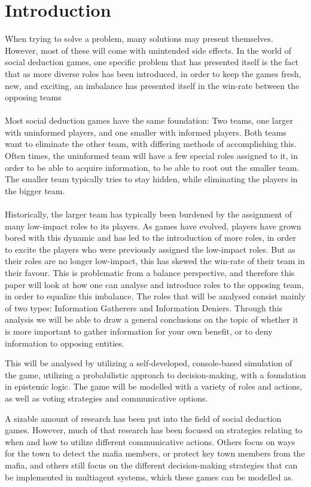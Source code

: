 \section{Introduction}
When trying to solve a problem, many solutions may present themselves. However,
most of these will come with unintended side effects. In the world of social
deduction games, one specific problem that has presented itself is the fact
that as more diverse roles has been introduced, in order to keep the games
fresh, new, and exciting, an imbalance has presented itself in the win-rate
between the opposing teams \\ \\ Most social deduction games have the same
foundation: Two teams, one larger with uninformed players, and one smaller with
informed players. Both teams want to eliminate the other team, with differing
methods of accomplishing this. Often times, the uninformed team will have a few
special roles assigned to it, in order to be able to acquire information, to be
able to root out the smaller team. The smaller team typically tries to stay
hidden, while eliminating the players in the bigger team.\\ \\ Historically,
the larger team has typically been burdened by the assignment of many
low-impact roles to its players. As games have evolved, players have grown
bored with this dynamic and has led to the introduction of more roles, in order
to excite the players who were previously assigned the low-impact roles. But as
their roles are no longer low-impact, this has skewed the win-rate of their
team in their favour. This is problematic from a balance perspective, and
therefore this paper will look at how one can analyse and introduce roles to
the opposing team, in order to equalize this imbalance. The roles that will be
analysed consist mainly of two types: Information Gatherers and Information
Deniers. Through this analysis we will be able to draw a general conclusions on
the topic of whether it is more important to gather information for your own
benefit, or to deny information to opposing entities.

This will be analysed by utilizing a self-developed, console-based simulation
of the game, utilizing a probabilistic approach to decision-making, with a
foundation in epistemic logic. The game will be modelled with a variety of
roles and actions, as well as voting strategies and communicative options.

A sizable amount of research has been put into the field of social deduction
games. However, much of that research has been focused on strategies relating
to when and how to utilize different communicative actions\cite{commitment}.
Others focus on ways for the town to detect the mafia
members\cite{werewolf_stealth}, or protect key town members from the
mafia\cite{werewolf_nash_equilibrium}, and others still focus on the different
decision-making strategies that can be implemented in multiagent systems, which
these games can be modelled
as\cite{modelling_multi_agent_epistemic_systems}\cite{multi_agent_epistemic_planner_common_knowledge}\cite{probibalistic_multiagent_systems}.

